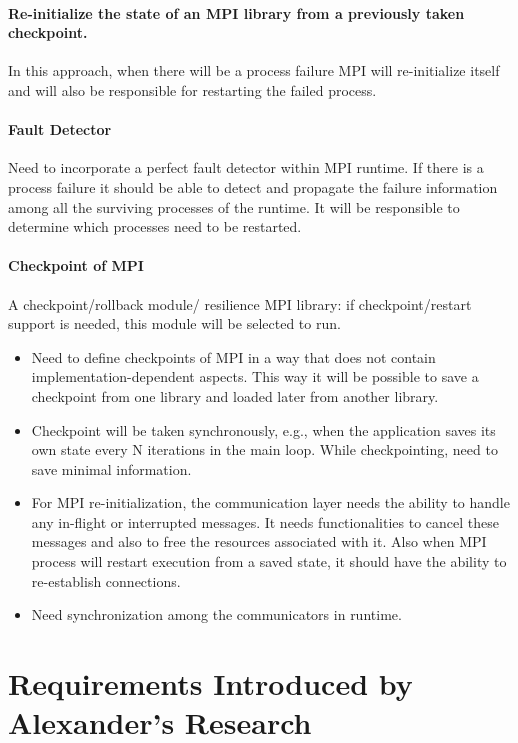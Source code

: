\documentclass{article}
\begin{document}
\paragraph{Re-initialize the state of an MPI library from a previously taken checkpoint.}

In this approach, when there will be a process failure MPI will re-initialize itself and 
	will also be responsible for restarting the failed process.
	
\paragraph{Fault Detector}
	Need to incorporate a perfect fault detector within MPI runtime. If there is a process failure it should be able to detect and  propagate the failure information among all the surviving processes of the runtime.  It will be responsible to determine which processes need to be restarted.
	
\paragraph{Checkpoint of MPI}
	A checkpoint/rollback module/ resilience MPI library: if checkpoint/restart support is needed, this module will be selected to run.
	
\begin{itemize}
\item Need to define checkpoints of MPI in a way that does not contain implementation-dependent aspects.  This way it will be possible to save a checkpoint from one library and loaded later from another library.
\item Checkpoint will be taken synchronously, e.g., when the application saves its own state every N iterations in the main loop. While checkpointing, need to save minimal information.
\item 	For MPI re-initialization, the communication layer needs the ability to handle any in-flight or interrupted messages.  It needs functionalities to cancel these messages and also to free the resources associated with it.  Also when MPI process will restart execution from a saved state, it should have the ability to re-establish connections.
\item Need synchronization among the communicators in runtime.
\end{itemize}


\section{Requirements Introduced by Alexander's Research}
\end{document}
